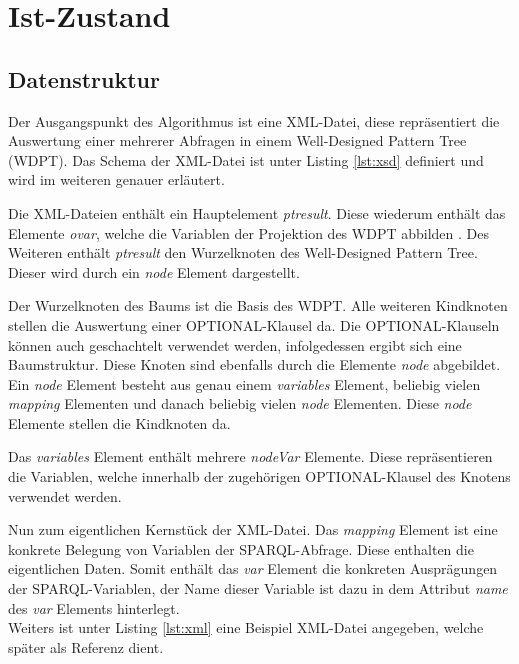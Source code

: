 \documentclass[draft,final]{vutinfth} %
\begin{document}
\chapter{Ist-Zustand}
\section{Datenstruktur} \label{dataStruk}
Der Ausgangspunkt des Algorithmus ist eine XML-Datei, diese repräsentiert die Auswertung einer mehrerer Abfragen in einem Well-Designed Pattern Tree (WDPT). Das Schema der XML-Datei ist unter Listing \ref{lst:xsd} definiert und wird im weiteren genauer erläutert.

Die XML-Dateien enthält ein Hauptelement \textit{ptresult}. Diese wiederum enthält das Elemente \textit{ovar}, welche die Variablen der Projektion des WDPT abbilden \cite[S.~171]{OptMat}. Des Weiteren enthält \textit{ptresult} den Wurzelknoten des Well-Designed Pattern Tree. Dieser wird durch ein \textit{node} Element dargestellt.

Der Wurzelknoten des Baums ist die Basis des WDPT. Alle weiteren Kindknoten stellen die Auswertung einer OPTIONAL-Klausel da. Die OPTIONAL-Klauseln können auch geschachtelt verwendet werden, infolgedessen ergibt sich eine Baumstruktur. Diese Knoten sind ebenfalls durch die Elemente \textit{node} abgebildet. Ein \textit{node} Element besteht aus genau einem \textit{variables} Element, beliebig vielen \textit{mapping} Elementen und danach beliebig vielen \textit{node} Elementen. Diese \textit{node} Elemente stellen die Kindknoten da.

Das \textit{variables} Element enthält mehrere \textit{nodeVar} Elemente. Diese repräsentieren die Variablen, welche innerhalb der zugehörigen OPTIONAL-Klausel des Knotens verwendet werden.

Nun zum eigentlichen Kernstück der XML-Datei. Das \textit{mapping} Element ist eine konkrete Belegung von Variablen der SPARQL-Abfrage. Diese enthalten die eigentlichen Daten. Somit enthält das \textit{var} Element die konkreten Ausprägungen der SPARQL-Variablen, der Name dieser Variable ist dazu in dem Attribut \textit{name} des \textit{var} Elements hinterlegt.\\


Weiters ist unter Listing \ref{lst:xml} eine Beispiel XML-Datei angegeben, welche später als Referenz dient.

\end{document}
